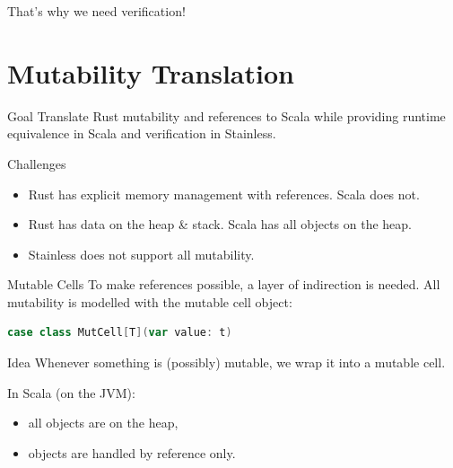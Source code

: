 \begin{frame}[standout]
That's why we need verification!
\end{frame}


\section{Mutability Translation}

\begin{frame}{Goal}
Translate Rust mutability and references to Scala while providing runtime
equivalence in Scala and verification in Stainless.
\end{frame}

\begin{frame}{Challenges}
\begin{itemize}
\item Rust has explicit memory management with references. Scala does not.
\item Rust has data on the heap \& stack. Scala has all objects on the heap.
\item Stainless does not support all mutability.
\end{itemize}
\end{frame}


\begin{frame}[fragile]{Mutable Cells}
To make references possible, a layer of indirection is needed. All mutability is
modelled with the mutable cell object:
\begin{lstlisting}[language=Scala, style=short]
case class MutCell[T](var value: t)
\end{lstlisting}
\vfill
\begin{block}{Idea}
Whenever something is (possibly) mutable, we wrap it into a mutable cell.
\end{block}
\vfill
In Scala (on the JVM):
\begin{itemize}
  \item all objects are on the heap,
  \item objects are handled by reference only.
\end{itemize}
\end{frame}

